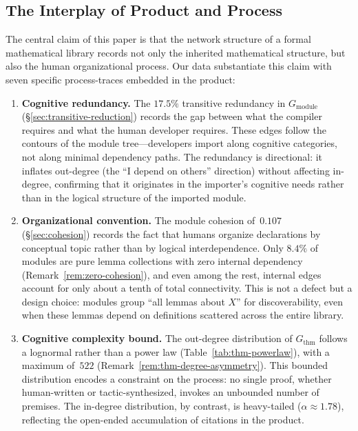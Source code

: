 \subsection{The Interplay of Product and Process}
\label{sec:interplay}

The central claim of this paper is that the network structure of a formal mathematical library records not only the inherited mathematical structure, but also the human organizational process. Our data substantiate this claim with seven specific process-traces embedded in the product:

\begin{enumerate}
\item \textbf{Cognitive redundancy.} The $17.5\%$ transitive redundancy in $G_{\mathrm{module}}$ (\S\ref{sec:transitive-reduction}) records the gap between what the compiler requires and what the human developer requires. These edges follow the contours of the module tree---developers import along cognitive categories, not along minimal dependency paths. The redundancy is directional: it inflates out-degree (the ``I depend on others'' direction) without affecting in-degree, confirming that it originates in the importer's cognitive needs rather than in the logical structure of the imported module.

\item \textbf{Organizational convention.} The module cohesion of~$0.107$ (\S\ref{sec:cohesion}) records the fact that humans organize declarations by conceptual topic rather than by logical interdependence. Only $8.4\%$ of modules are pure lemma collections with zero internal dependency (Remark~\ref{rem:zero-cohesion}), and even among the rest, internal edges account for only about a tenth of total connectivity. This is not a defect but a design choice: modules group ``all lemmas about $X$'' for discoverability, even when these lemmas depend on definitions scattered across the entire library.

\item \textbf{Cognitive complexity bound.} The out-degree distribution of $G_{\mathrm{thm}}$ follows a lognormal rather than a power law (Table~\ref{tab:thm-powerlaw}), with a maximum of~$522$ (Remark~\ref{rem:thm-degree-asymmetry}). This bounded distribution encodes a constraint on the process: no single proof, whether human-written or tactic-synthesized, invokes an unbounded number of premises. The in-degree distribution, by contrast, is heavy-tailed ($\alpha \approx 1.78$), reflecting the open-ended accumulation of citations in the product.


\end{enumerate}
